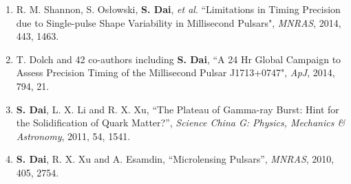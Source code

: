 \begin{enumerate}
\item R. M. Shannon, S. Os{\l}owski, \textbf{S. Dai}, \textsl{et al}.
``Limitations in Timing Precision due to Single-pulse Shape Variability in Millisecond Pulsars",
\textsl{MNRAS}, 2014, 443, 1463.

\item T. Dolch and 42 co-authors including \textbf{S. Dai},
``A 24 Hr Global Campaign to Assess Precision Timing of the Millisecond Pulsar J1713+0747", 
\textsl{ApJ}, 2014, 794, 21.

\item \textbf{S. Dai}, L. X. Li and R. X. Xu,
``The Plateau of Gamma-ray Burst: Hint for the Solidification of Quark Matter?'',
\textsl{Science China G: Physics, Mechanics \& Astronomy}, 2011, 54, 1541.

\item \textbf{S. Dai}, R. X. Xu and A. Esamdin,
``Microlensing Pulsars'',
\textsl{MNRAS}, 2010, 405, 2754.

\end{enumerate}

\pkuthssffaq


